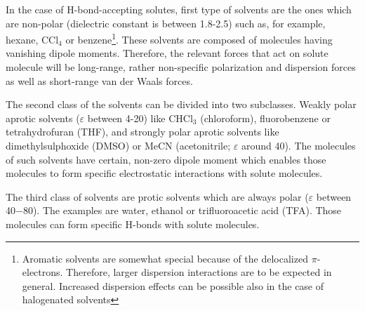 \documentclass[b5paper,oneside,fleqn,11pt]{book}
\begin{document}
\begin{refsection}
In the case of H\hyp{}bond\hyp{}accepting solutes, first type of solvents are the ones
which are non\hyp{}polar (dielectric constant is between 1.8-2.5) such as, for example,
hexane, CCl$_4$ or benzene\footnote{Aromatic solvents are somewhat special because 
of the delocalized $\pi$-electrons. Therefore, larger dispersion interactions are to be expected in general.
Increased dispersion effects can be possible also in the case of halogenated solvents}. 
These solvents are composed
of molecules having vanishing dipole moments. Therefore, the relevant forces that act on
solute molecule will be long\hyp{}range, rather non\hyp{}specific polarization and dispersion
forces as well as short\hyp{}range van der Waals forces. 

The second class of the solvents can be divided into two subclasses. 
Weakly polar aprotic solvents ($\varepsilon$ between 4-20) 
like CHCl$_3$ (chloroform), fluorobenzene or tetrahydrofuran (THF), 
and strongly polar aprotic solvents like dimethylsulphoxide (DMSO) 
or MeCN (acetonitrile; $\varepsilon$ around 40).
The molecules of such solvents have certain, non-zero dipole moment 
which enables those molecules to form specific electrostatic interactions with 
solute molecules.

The third class of solvents are protic solvents which are always polar 
($\varepsilon$ between 40$-$80). The examples are water, ethanol or trifluoroacetic acid (TFA).
Those molecules can form specific H\hyp{}bonds with solute molecules. 


\end{refsection}
\end{document}
